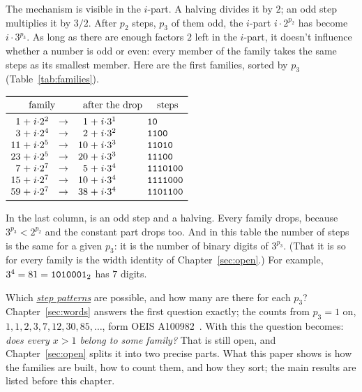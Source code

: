 \documentclass[10pt,a4paper,titlepage]{article}
\makeatletter
\newcommand{\termhere}[1]{\leavevmode
  \Hy@raisedlink{\hyper@anchorstart{term:#1}\hyper@anchorend}}
\newcommand{\keyterm}[2]{\hyperlink{box:#1}{\emph{#2}}}
\newcommand{\keysym}[2]{\hyperlink{box:#1}{#2}}
\newcommand{\bin}[1]{\text{\texttt{#1}}_2}
\newenvironment{herefloat}[1]
  {\par\addvspace{\intextsep}\noindent\begin{minipage}{\linewidth}%
   \def\@captype{#1}\centering}
  {\end{minipage}\par\nopagebreak\vspace{\intextsep}}
\makeatother
\begin{document}
\pagebreak[0]
\termhere{p3}\termhere{p2}The mechanism is visible in the $i$-part. A halving divides it by $2$; an odd
step multiplies it by $3/2$. After \keysym{p2}{$p_2$} steps, \keysym{p3}{$p_3$} of them odd, the $i$-part
$i\cdot 2^{p_2}$ has become $i\cdot 3^{p_3}$. As long as there are enough
factors $2$ left in the $i$-part, it doesn't influence whether a number is odd
or even: every member of the family takes the same steps as its smallest
member. Here are the first families, sorted by $p_3$ (Table~\ref{tab:families}).

\nopagebreak
\begin{herefloat}{table}
$\begin{array}{r@{\;+\;i\cdot}l@{\quad\to\quad}r@{\;+\;i\cdot}l@{\qquad}l}
\toprule
\multicolumn{2}{c}{\text{family}} & \multicolumn{2}{c}{\text{after the drop}} & \quad\text{steps} \\
\midrule
1 & 2^2 & 1 & 3^1 & \bw{10} \\
3 & 2^4 & 2 & 3^2 & \bw{1100} \\
11 & 2^5 & 10 & 3^3 & \bw{11010} \\
23 & 2^5 & 20 & 3^3 & \bw{11100} \\
7 & 2^7 & 5 & 3^4 & \bw{1110100} \\
15 & 2^7 & 10 & 3^4 & \bw{1111000} \\
59 & 2^7 & 38 & 3^4 & \bw{1101100} \\
\bottomrule
\end{array}$
\caption{The first families: class id (Chapter~\ref{sec:numbers}) plus multiples of $2^{p_2}$, the values after the drop, and the steps.}
\label{tab:families}
\end{herefloat}

\termhere{steppattern}In the last column,  is an odd step and  a halving. Every family drops,
because $3^{p_3} < 2^{p_2}$ and the constant part drops too. And in this table the number of
steps is the same for a given $p_3$: it is the number of binary digits
of $3^{p_3}$. (That it is so for every family is the width identity of
Chapter~\ref{sec:open}.) For example, $3^4 = 81 = \bin{1010001}$ has $7$ digits.

\nopagebreak
Which \keyterm{steppattern}{step patterns} are possible, and how many are there for each $p_3$?
Chapter~\ref{sec:words} answers the first question exactly; the counts
from $p_3 = 1$ on, $1, 1, 2, 3, 7, 12, 30, 85, \dots$, form OEIS A100982~\cite{OEIS_A100982}.
With this the question becomes: \emph{does every $x > 1$ belong to some
family?} That is still open, and Chapter~\ref{sec:open} splits it into two
precise parts. What this paper shows is how the families are built, how to
count them, and how they sort; the main results are listed before this chapter.
\end{document}
